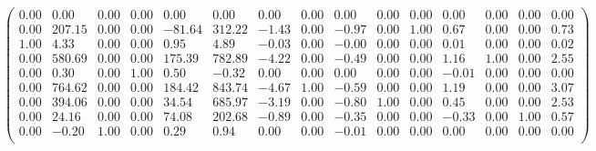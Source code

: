 \documentclass{article}
\begin{document}
\begin{flushleft}
\begin{equation*}
\begin{pmatrix}
 0.00 &   0.00 & 0.00 & 0.00 &   0.00 &   0.00 &  0.00 & 0.00 &  0.00 & 0.00 & 0.00 &  0.00 & 0.00 & 0.00 & 0.00 \\
 0.00 & 207.15 & 0.00 & 0.00 & -81.64 & 312.22 & -1.43 & 0.00 & -0.97 & 0.00 & 1.00 &  0.67 & 0.00 & 0.00 & 0.73 \\
 1.00 &   4.33 & 0.00 & 0.00 &   0.95 &   4.89 & -0.03 & 0.00 & -0.00 & 0.00 & 0.00 &  0.01 & 0.00 & 0.00 & 0.02 \\
 0.00 & 580.69 & 0.00 & 0.00 & 175.39 & 782.89 & -4.22 & 0.00 & -0.49 & 0.00 & 0.00 &  1.16 & 1.00 & 0.00 & 2.55 \\
 0.00 &   0.30 & 0.00 & 1.00 &   0.50 &  -0.32 &  0.00 & 0.00 &  0.00 & 0.00 & 0.00 & -0.01 & 0.00 & 0.00 & 0.00 \\
 0.00 & 764.62 & 0.00 & 0.00 & 184.42 & 843.74 & -4.67 & 1.00 & -0.59 & 0.00 & 0.00 &  1.19 & 0.00 & 0.00 & 3.07 \\
 0.00 & 394.06 & 0.00 & 0.00 &  34.54 & 685.97 & -3.19 & 0.00 & -0.80 & 1.00 & 0.00 &  0.45 & 0.00 & 0.00 & 2.53 \\
 0.00 &  24.16 & 0.00 & 0.00 &  74.08 & 202.68 & -0.89 & 0.00 & -0.35 & 0.00 & 0.00 & -0.33 & 0.00 & 1.00 & 0.57 \\
 0.00 &  -0.20 & 1.00 & 0.00 &   0.29 &   0.94 &  0.00 & 0.00 & -0.01 & 0.00 & 0.00 &  0.00 & 0.00 & 0.00 & 0.00 \\
\end{pmatrix}
\end{equation*}
\end{flushleft}
\end{document}
